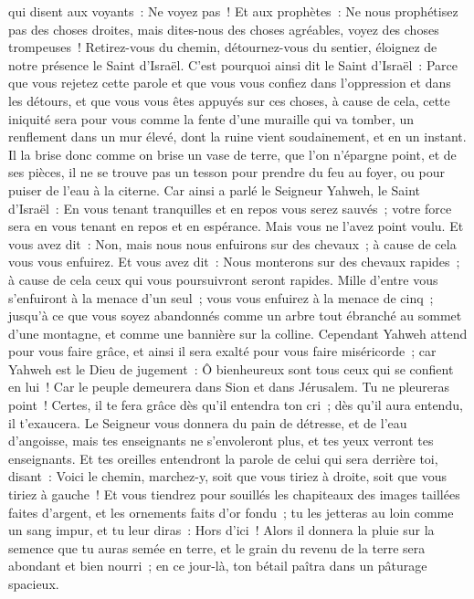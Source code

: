 \begin{multicols}{2}
qui disent aux voyants~: Ne voyez pas~! Et aux prophètes~: Ne nous prophétisez pas des choses droites, mais dites-nous des choses agréables, voyez des choses trompeuses~!
Retirez-vous du chemin, détournez-vous du sentier, éloignez de notre présence le Saint d'Israël.
C'est pourquoi ainsi dit le Saint d'Israël~: Parce que vous rejetez cette parole et que vous vous confiez dans l'oppression et dans les détours, et que vous vous êtes appuyés sur ces choses,
à cause de cela, cette iniquité sera pour vous comme la fente d'une muraille qui va tomber, un renflement dans un mur élevé, dont la ruine vient soudainement, et en un instant.
Il la brise donc comme on brise un vase de terre, que l'on n'épargne point, et de ses pièces, il ne se trouve pas un tesson pour prendre du feu au foyer, ou pour puiser de l'eau à la citerne.
Car ainsi a parlé le Seigneur Yahweh, le Saint d'Israël~: En vous tenant tranquilles et en repos vous serez sauvés~; votre force sera en vous tenant en repos et en espérance. Mais vous ne l'avez point voulu.
Et vous avez dit~: Non, mais nous nous enfuirons sur des chevaux~; à cause de cela vous vous enfuirez. Et vous avez dit~: Nous monterons sur des chevaux rapides~; à cause de cela ceux qui vous poursuivront seront rapides.
Mille d'entre vous s'enfuiront à la menace d'un seul~; vous vous enfuirez à la menace de cinq~; jusqu'à ce que vous soyez abandonnés comme un arbre tout ébranché au sommet d'une montagne, et comme une bannière sur la colline.
Cependant Yahweh attend pour vous faire grâce, et ainsi il sera exalté pour vous faire miséricorde~; car Yahweh est le Dieu de jugement~: Ô bienheureux sont tous ceux qui se confient en lui~!
Car le peuple demeurera dans Sion et dans Jérusalem. Tu ne pleureras point~! Certes, il te fera grâce dès qu'il entendra ton cri~; dès qu'il aura entendu, il t'exaucera.
Le Seigneur vous donnera du pain de détresse, et de l'eau d'angoisse, mais tes enseignants ne s'envoleront plus, et tes yeux verront tes enseignants.
Et tes oreilles entendront la parole de celui qui sera derrière toi, disant~: Voici le chemin, marchez-y, soit que vous tiriez à droite, soit que vous tiriez à gauche~!
Et vous tiendrez pour souillés les chapiteaux des images taillées faites d'argent, et les ornements faits d'or fondu~; tu les jetteras au loin comme un sang impur, et tu leur diras~: Hors d'ici~!
Alors il donnera la pluie sur la semence que tu auras semée en terre, et le grain du revenu de la terre sera abondant et bien nourri~; en ce jour-là, ton bétail paîtra dans un pâturage spacieux.

\end{multicols}
